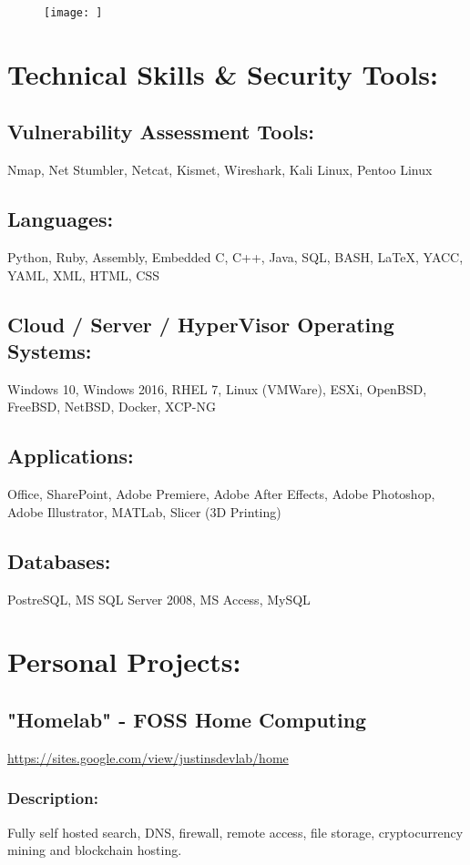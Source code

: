 \documentclass[letter,10pt]{article}
\begin{document}
\begin{figure}
\texttt{[image: ]}
\end{figure}

\section*{Technical Skills \& Security Tools:}
\label{sec:org292c810}
\subsection*{Vulnerability Assessment Tools:}
\label{sec:org6c01c28}
Nmap, Net Stumbler, Netcat, Kismet, Wireshark, Kali Linux, Pentoo Linux
\subsection*{Languages:}
\label{sec:orgcc12d7c}
Python, Ruby, Assembly, Embedded C, C++, Java, SQL, BASH, \LaTeX{}, YACC, YAML, XML, HTML, CSS
\subsection*{Cloud / Server / HyperVisor Operating Systems:}
\label{sec:orgfaea82b}
Windows 10, Windows 2016, RHEL 7, Linux  (VMWare), ESXi, OpenBSD, FreeBSD, NetBSD, Docker, XCP-NG
\subsection*{Applications:}
\label{sec:org6924fc0}
Office, SharePoint, Adobe Premiere, Adobe After Effects, Adobe Photoshop, Adobe Illustrator, MATLab, Slicer (3D Printing)
\subsection*{Databases:}
\label{sec:org4776555}
PostreSQL, MS SQL Server 2008, MS Access, MySQL
\pagebreak

\section*{Personal Projects:}
\label{sec:orgf138b8f}
\subsection*{"Homelab" - FOSS Home Computing}
\label{sec:org4f67579}
\url{https://sites.google.com/view/justinsdevlab/home}
\subsubsection*{Description:}
\label{sec:orga7238a9}
Fully self hosted search, DNS, firewall, remote access, file storage, cryptocurrency mining and blockchain hosting.
\end{document}
